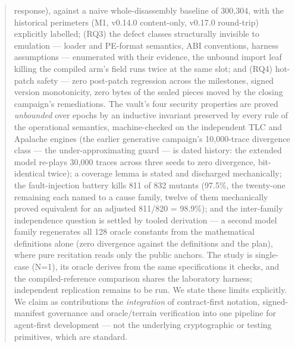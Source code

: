 \documentclass[11pt,a4paper]{article}
\begin{document}
\begin{abstract}
response), against a naive whole-disassembly baseline of 300{,}304, with
the historical perimeters (M1, v0.14.0 content-only, v0.17.0 round-trip)
explicitly labelled; (RQ3) the defect classes structurally invisible to
emulation --- loader and PE-format semantics, ABI conventions, harness
assumptions --- enumerated with their evidence, the unbound import leaf
killing the compiled arm's field runs twice at the same slot; and (RQ4)
hot-patch safety --- zero post-patch regression across the milestones,
signed version monotonicity, zero bytes of the sealed pieces moved by the
closing campaign's remediations. The vault's four security properties are
proved \emph{unbounded} over epochs by an inductive invariant preserved by
every rule of the operational semantics, machine-checked on the
independent TLC and Apalache engines (the earlier generative campaign's
10{,}000-trace divergence class --- the under-approximating guard --- is
dated history: the extended model re-plays 30{,}000 traces across three
seeds to zero divergence, bit-identical twice); a coverage lemma is stated
and discharged mechanically; the fault-injection battery kills 811 of 832
mutants (97.5\%, the twenty-one remaining each named to a cause family,
twelve of them mechanically proved equivalent for an adjusted 811/820 =
98.9\%); and the inter-family independence question is settled by tooled
derivation --- a second model family regenerates all 128 oracle constants
from the mathematical definitions alone (zero divergence against the
definitions and the plan), where pure recitation reads only the public
anchors. The study is single-case (N=1), its oracle derives from the same
specifications it checks, and the compiled-reference comparison shares the
laboratory harness; independent replication remains to be run. We state
these limits explicitly. We claim as contributions the \emph{integration}
of contract-first notation, signed-manifest governance and oracle/terrain
verification into one pipeline for agent-first development --- not the
underlying cryptographic or testing primitives, which are standard.
\end{abstract}
\end{document}
